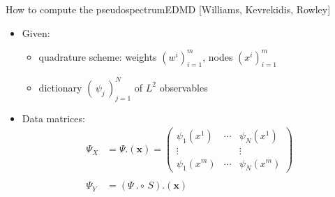 \documentclass[
  english,            %
  aspectratio=169,    %
]{tumbeamer}
\begin{document}
\begin{frame}{How to compute the pseudospectrum}{EDMD [Williams, Kevrekidis, Rowley]}
  
\begin{itemize}
  \item Given: 
  \begin{itemize}
    \item quadrature scheme: weights $(w^i)_{i=1}^m$, nodes $(x^i)_{i=1}^m$
    \item dictionary $(\, \psi_j \,)_{j=1}^N$ of $L^2$ observables
  \end{itemize}
  \item Data matrices: 
  \begin{align}
    \Psi_X &= \Psi . (\mathbf{x}) = 
    \begin{pmatrix}
      \psi_1 (x^1) & \cdots & \psi_N (x^1) \\
      \vdots & & \vdots \\
      \psi_1 (x^m) & \cdots & \psi_N (x^m)
    \end{pmatrix} \\
    & \\
    \Psi_Y &= (\Psi\ .\circ \,S) . (\mathbf{x})
  \end{align}
\end{itemize}

\end{frame}
\end{document}
